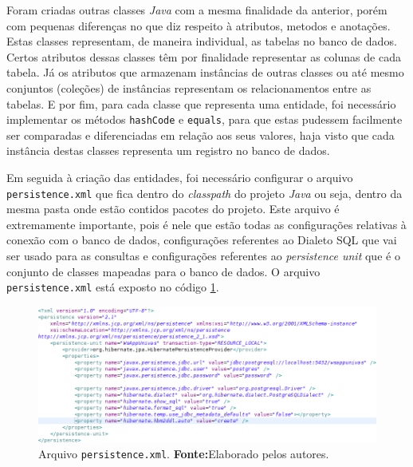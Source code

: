 		\pagebreak
		
		\par Foram criadas outras classes \textit{Java} com a mesma finalidade da
	anterior, porém com pequenas diferenças no que diz respeito à atributos,
	metodos e anotações. Estas classes representam, de maneira individual, as
	tabelas no banco de dados. Certos atributos dessas classes têm por finalidade
	representar as colunas de cada tabela. Já os atributos que armazenam instâncias
	de outras classes ou até mesmo conjuntos (coleções) de instâncias representam os
	relacionamentos entre as tabelas. E por fim, para cada classe que representa uma
	entidade, foi necessário implementar os métodos \texttt{hashCode} e
	\texttt{equals}, para que estas pudessem facilmente ser comparadas e
	diferenciadas em relação aos seus valores, haja visto que cada instância
	destas classes representa um registro no banco de dados.
		
		\par Em seguida à criação das entidades, foi necessário configurar o arquivo
	\texttt{persistence.xml} que fica dentro do \textit{classpath} do projeto
	\textit{Java} ou seja, dentro da mesma pasta onde estão contidos pacotes do
	projeto. Este arquivo é extremamente importante, pois é nele que estão todas
	as configurações relativas à conexão com o banco de dados, configurações
	referentes ao Dialeto SQL que vai ser usado para as consultas e configurações
	referentes ao \textit{persistence unit} que é o conjunto de classes mapeadas
	para o banco de dados.	O arquivo \texttt{persistence.xml} está exposto no
	código \ref{fig:qm9}.
	
 		\begin{figure}[h!]
			\centerline{\includegraphics[scale=0.6]{./imagens/2_q_metodologico/qm9.png}}
			\caption[Arquivo \texttt{persistence.xml}]{Arquivo \texttt{persistence.xml}.
			\textbf{Fonte:}Elaborado pelos autores.}
			\label{fig:qm9}
		\end{figure}
		
